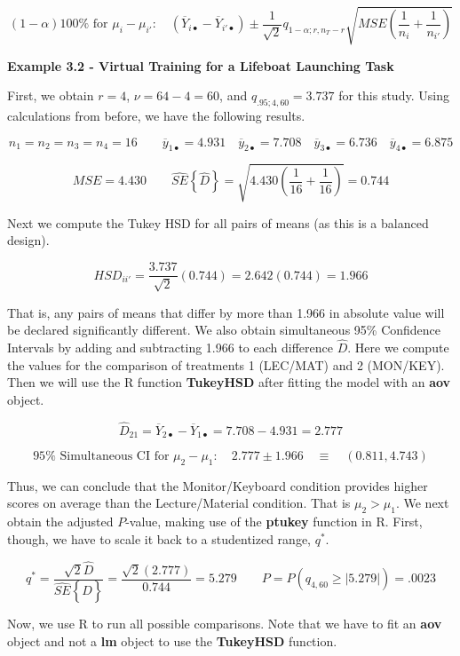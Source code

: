 \documentclass[
]{book}
\begin{document}
\[
(1-\alpha)100\% \mbox{ for } \mu_i-\mu_{i'}: \quad
\left(\overline{Y}_{i\bullet}-
\overline{Y}_{i'\bullet}\right) \pm
\frac{1}{\sqrt{2}}q_{1-\alpha;r,n_T-r}
\sqrt{MSE
\left(\frac{1}{n_i}+\frac{1}{n_{i'}}\right)}
\]

\textbf{Example 3.2 - Virtual Training for a Lifeboat Launching Task}

First, we obtain \(r=4\), \(\nu=64-4=60\), and \(q_{.95;4,60}=3.737\)
for this study. Using calculations from before, we have the following
results.

\[
n_1=n_2=n_3=n_4=16 \qquad \overline{y}_{1\bullet}=4.931 \quad
\overline{y}_{2\bullet}=7.708 \quad
\overline{y}_{3\bullet}=6.736 \quad
\overline{y}_{4\bullet}=6.875 
\]

\[
MSE = 4.430 \qquad \hat{SE}\left\{\hat{D}\right\}=
\sqrt{4.430\left(\frac{1}{16}+\frac{1}{16}\right)}=0.744
\]

Next we compute the Tukey HSD for all pairs of means (as this is a
balanced design).

\[
HSD_{ii'}=\frac{3.737}{\sqrt{2}}(0.744)=2.642(0.744)=1.966
\]

That is, any pairs of means that differ by more than 1.966 in absolute
value will be declared significantly different. We also obtain
simultaneous 95\% Confidence Intervals by adding and subtracting 1.966
to each difference \(\hat{D}\). Here we compute the values for the
comparison of treatments 1 (LEC/MAT) and 2 (MON/KEY). Then we will use
the R function \textbf{TukeyHSD} after fitting the model with an
\textbf{aov} object.

\[
\hat{D}_{21}=\overline{Y}_{2\bullet}-\overline{Y}_{1\bullet}=
7.708-4.931=2.777
\]

\[
95\% \mbox{ Simultaneous CI for } \mu_2-\mu_1: \quad
2.777 \pm 1.966 \quad \equiv \quad (0.811,4.743) 
\]

Thus, we can conclude that the Monitor/Keyboard condition provides
higher scores on average than the Lecture/Material condition. That is
\(\mu_2>\mu_1\). We next obtain the adjusted \(P\)-value, making use of
the \textbf{ptukey} function in R. First, though, we have to scale it
back to a studentized range, \(q^*\).

\[
q^* = \frac{\sqrt{2}\hat{D}}{\hat{SE}\left\{\hat{D}\right\}}=
\frac{\sqrt{2}(2.777)}{0.744}=5.279  \qquad 
P= P\left(q_{4,60}\ge |5.279|\right)=.0023
\]

Now, we use R to run all possible comparisons. Note that we have to fit
an \textbf{aov} object and not a \textbf{lm} object to use the
\textbf{TukeyHSD} function.
\end{document}

